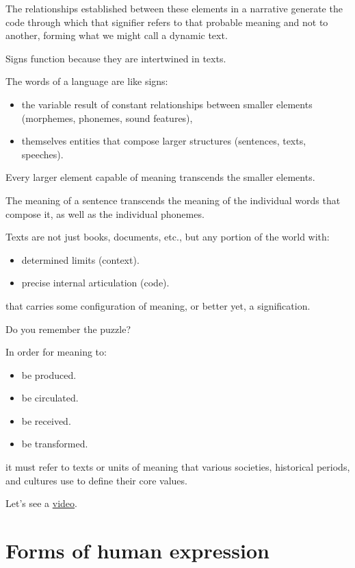 The relationships established between these elements in a narrative generate the code through which that signifier refers to that probable meaning and not to another, forming what we might call a dynamic text.

Signs function because they are intertwined in texts.

The words of a language are like signs:

\begin{itemize}
\tightlist
\item the variable result of constant relationships between smaller elements (morphemes, phonemes, sound features),
\item themselves entities that compose larger structures (sentences, texts, speeches).
\end{itemize}

Every larger element capable of meaning transcends the smaller elements.

The meaning of a sentence transcends the meaning of the individual words that compose it, as well as the individual phonemes.

Texts are not just books, documents, etc., but any portion of the world with:

\begin{itemize}
\tightlist
\item determined limits (context).
\item precise internal articulation (code).
\end{itemize}

that carries some configuration of meaning, or better yet, a signification.

Do you remember the puzzle?

In order for meaning to:

\begin{itemize}
\tightlist
\item be produced.
\item be circulated.
\item be received.
\item be transformed.
\end{itemize}

it must refer to texts or units of meaning that various societies, historical periods, and cultures use to define their core values.

Let's see a \href{http://www.musicaecodice.it/gitmedia/emc/1_media/storia1.mp4}{video}.

\section{Forms of human expression}\label{forms-of-human-expression}

